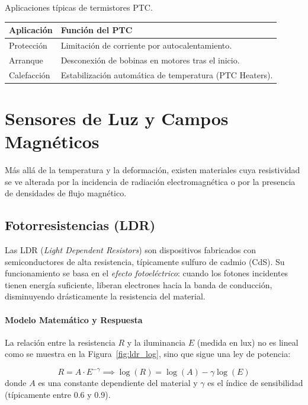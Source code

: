 \begin{margintable}
    \centering
    \caption[Aplicaciones típicas de termistores PTC.]{Aplicaciones típicas de termistores PTC.\protect\label{tab:ptc_apps}}
    \begin{tabularx}{\linewidth}{M{2cm} X}
        \\  
        \toprule
        \textbf{Aplicación} & \textbf{Función del PTC} \\
        \midrule
        Protección & Limitación de corriente por autocalentamiento. \\
        Arranque & Desconexión de bobinas en motores tras el inicio. \\
        Calefacción & Estabilización automática de temperatura (PTC Heaters). \\
        \bottomrule
    \end{tabularx}
\end{margintable}

\section{Sensores de Luz y Campos Magnéticos}\label{sec:otros_resistivos}

Más allá de la temperatura y la deformación, existen materiales cuya resistividad se ve alterada por la incidencia de radiación electromagnética o por la presencia de densidades de flujo magnético.

\subsection{Fotorresistencias (LDR)}

Las LDR (\textit{Light Dependent Resistors}) son dispositivos fabricados con semiconductores de alta resistencia, típicamente sulfuro de cadmio (CdS). Su funcionamiento se basa en el \emph{efecto fotoeléctrico}: cuando los fotones incidentes tienen energía suficiente, liberan electrones hacia la banda de conducción, disminuyendo drásticamente la resistencia del material.

\paragraph{Modelo Matemático y Respuesta}
La relación entre la resistencia $R$ y la iluminancia $E$ (medida en lux) no es lineal como se muestra en la Figura~\ref{fig:ldr_log}, sino que sigue una ley de potencia:

\begin{equation}\label{eq:ldr_potencia}
    R = A \cdot E^{-\gamma} \implies \log(R) = \log(A) - \gamma \log(E)
\end{equation}
donde $A$ es una constante dependiente del material y $\gamma$ es el índice de sensibilidad (típicamente entre \num{0.6} y \num{0.9}).

